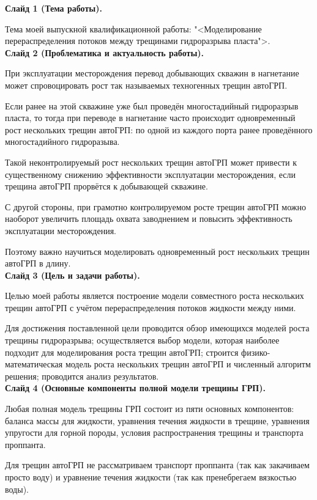 \documentclass[a4paper, 12pt]{article}
\begin{document}

\textbf{Слайд 1 (Тема работы).}

Тема моей выпускной квалификационной работы: "<Моделирование перераспределения потоков между трещинами гидроразрыва пласта">.
\\


\textbf{Слайд 2 (Проблематика и актуальность работы).}

При эксплуатации месторождения перевод добывающих скважин в нагнетание может спровоцировать рост так называемых техногенных трещин автоГРП.

Если ранее на этой скважине уже был проведён многостадийный гидроразрыв пласта, то тогда при переводе в нагнетание часто происходит одновременный рост нескольких трещин автоГРП: по одной из каждого порта ранее проведённого многостадийного гидроразыва.

Такой неконтролируемый рост нескольких трещин автоГРП может привести к существенному снижению эффективности эксплуатации месторождения, если трещина автоГРП прорвётся к добывающей скважине.

С другой стороны, при грамотно контролируемом росте трещин автоГРП можно наоборот увеличить площадь охвата заводнением и повысить эффективность эксплуатации месторождения.

Поэтому важно научиться моделировать одновременный рост нескольких трещин автоГРП в длину.
\\ 


\textbf{Слайд 3 (Цель и задачи работы).}

Целью моей работы является построение модели совместного роста нескольких трещин автоГРП с учётом перераспределения потоков жидкости между ними.

Для достижения поставленной цели проводится обзор имеющихся моделей роста трещины гидроразрыва;
осуществляется выбор модели, которая наиболее подходит для моделирования роста трещин автоГРП;
строится физико-математическая модель роста нескольких трещин автоГРП и численный алгоритм решения;
проводится анализ результатов.
\\


\textbf{Слайд 4 (Основные компоненты полной модели трещины ГРП).}

Любая полная модель трещины ГРП состоит из пяти основных компонентов: баланса массы для жидкости, уравнения течения жидкости в трещине, уравнения упругости для горной породы, условия распространения трещины и транспорта проппанта.

Для трещин автоГРП не рассматриваем транспорт проппанта (так как закачиваем просто воду) и уравнение течения жидкости (так как пренебрегаем вязкостью воды).
\end{document}
